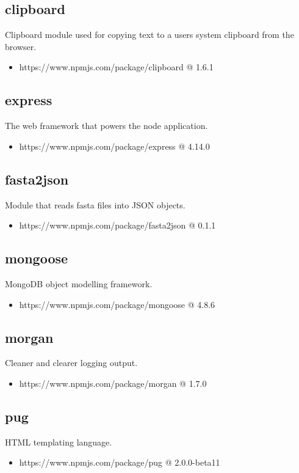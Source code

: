   \subsection{clipboard}
  Clipboard module used for copying text to a users system clipboard from the browser.
  \begin{itemize}
    \item https://www.npmjs.com/package/clipboard @ 1.6.1
  \end{itemize}

  \subsection{express}
  The web framework that powers the node application.
  \begin{itemize}
    \item https://www.npmjs.com/package/express @ 4.14.0
  \end{itemize}

  \subsection{fasta2json}
  Module that reads fasta files into JSON objects.
  \begin{itemize}
    \item https://www.npmjs.com/package/fasta2json @ 0.1.1
  \end{itemize}

  \subsection{mongoose}
  MongoDB object modelling framework.
  \begin{itemize}
    \item https://www.npmjs.com/package/mongoose @ 4.8.6
  \end{itemize}

  \subsection{morgan}
  Cleaner and clearer logging output.
  \begin{itemize}
    \item https://www.npmjs.com/package/morgan @ 1.7.0
  \end{itemize}

  \subsection{pug}
  HTML templating language.
  \begin{itemize}
    \item https://www.npmjs.com/package/pug @ 2.0.0-beta11
  \end{itemize}

